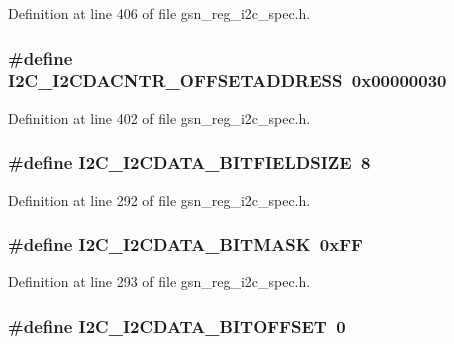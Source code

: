 Definition at line 406 of file gsn\_\-reg\_\-i2c\_\-spec.h.

\hypertarget{a00558_ac9b397b71b0b64bf13372c7a5272c514}{
\subsubsection[{I2C\_\-I2CDACNTR\_\-OFFSETADDRESS}]{\setlength{\rightskip}{0pt plus 5cm}\#define I2C\_\-I2CDACNTR\_\-OFFSETADDRESS~0x00000030}}
\label{a00558_ac9b397b71b0b64bf13372c7a5272c514}


Definition at line 402 of file gsn\_\-reg\_\-i2c\_\-spec.h.

\hypertarget{a00558_aa6480fdd06a972513e81833de23028e1}{
\subsubsection[{I2C\_\-I2CDATA\_\-BITFIELDSIZE}]{\setlength{\rightskip}{0pt plus 5cm}\#define I2C\_\-I2CDATA\_\-BITFIELDSIZE~8}}
\label{a00558_aa6480fdd06a972513e81833de23028e1}


Definition at line 292 of file gsn\_\-reg\_\-i2c\_\-spec.h.

\hypertarget{a00558_ab0854e83366d5b74d0180c2e655d40ce}{
\subsubsection[{I2C\_\-I2CDATA\_\-BITMASK}]{\setlength{\rightskip}{0pt plus 5cm}\#define I2C\_\-I2CDATA\_\-BITMASK~0xFF}}
\label{a00558_ab0854e83366d5b74d0180c2e655d40ce}


Definition at line 293 of file gsn\_\-reg\_\-i2c\_\-spec.h.

\hypertarget{a00558_ac6e18e4f3fde7f113689d9be992e1bec}{
\subsubsection[{I2C\_\-I2CDATA\_\-BITOFFSET}]{\setlength{\rightskip}{0pt plus 5cm}\#define I2C\_\-I2CDATA\_\-BITOFFSET~0}}
\label{a00558_ac6e18e4f3fde7f113689d9be992e1bec}


